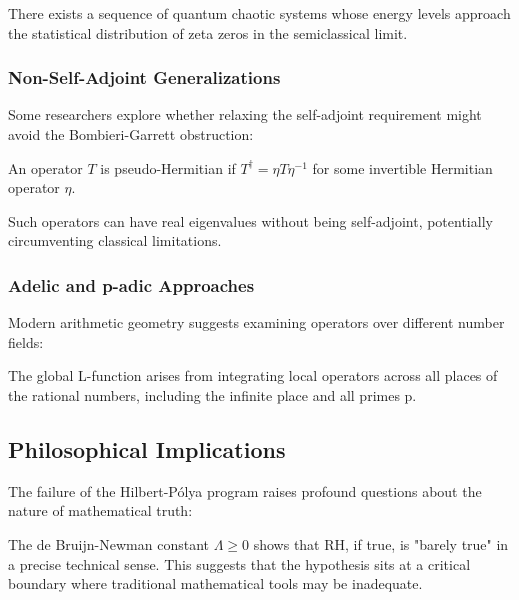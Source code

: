 \begin{conjecture}
There exists a sequence of quantum chaotic systems whose energy levels approach the statistical distribution of zeta zeros in the semiclassical limit.
\end{conjecture}

\subsubsection{Non-Self-Adjoint Generalizations}
Some researchers explore whether relaxing the self-adjoint requirement might avoid the Bombieri-Garrett obstruction:

\begin{definition}
An operator $T$ is pseudo-Hermitian if $T^\dagger = \eta T \eta^{-1}$ for some invertible Hermitian operator $\eta$.
\end{definition}

Such operators can have real eigenvalues without being self-adjoint, potentially circumventing classical limitations.

\subsubsection{Adelic and p-adic Approaches}
Modern arithmetic geometry suggests examining operators over different number fields:

\begin{conjecture}
The global L-function arises from integrating local operators across all places of the rational numbers, including the infinite place and all primes p.
\end{conjecture}

\subsection{Philosophical Implications}

The failure of the Hilbert-Pólya program raises profound questions about the nature of mathematical truth:

\begin{remark}
The de Bruijn-Newman constant $\Lambda \geq 0$ \cite{rodgerstao2020} shows that RH, if true, is "barely true" in a precise technical sense. This suggests that the hypothesis sits at a critical boundary where traditional mathematical tools may be inadequate.
\end{remark}

